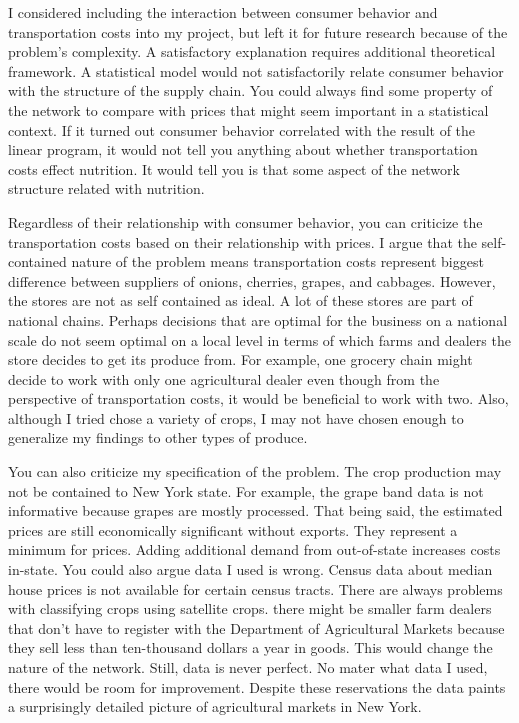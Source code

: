 \documentclass{report}
\begin{document}
I considered including the interaction between consumer behavior and transportation costs into my project, but left it for future research because of the problem's complexity. A satisfactory explanation requires additional theoretical framework. A statistical model would not satisfactorily relate consumer behavior with the structure of the supply chain. You could always find some property of the network to compare with prices that might seem important in a statistical context. If it turned out consumer behavior correlated with the result of the linear program, it would not tell you anything about whether transportation costs effect nutrition. It would tell you is that some aspect of the network structure related with nutrition.

Regardless of their relationship with consumer behavior, you can criticize the transportation costs based on their relationship with prices. I argue that the self-contained nature of the problem means transportation costs represent biggest difference between suppliers of onions, cherries, grapes, and cabbages. However, the stores are not as self contained as ideal. A lot of these stores are part of national chains. Perhaps decisions that are optimal for the business on a national scale do not seem optimal on a local level in terms of which farms and dealers the store decides to get its produce from. For example, one grocery chain might decide to work with only one agricultural dealer even though from the perspective of transportation costs, it would be beneficial to work with two. Also, although I tried chose a variety of crops, I may not have chosen enough to generalize my findings to other types of produce.

You can also criticize my specification of the problem. The crop production may not be contained to New York state. For example, the grape band data is not informative because grapes are mostly processed. That being said, the estimated prices are still economically significant without exports. They represent a minimum for prices. Adding additional demand from out-of-state increases costs in-state. You could also argue data I used is wrong. Census data about median house prices is not available for certain census tracts. There are always problems with classifying crops using satellite crops. there might be smaller farm dealers that don't have to register with the Department of Agricultural Markets because they sell less than ten-thousand dollars a year in goods. This would change the nature of the network. Still, data is never perfect. No mater what data I used, there would be room for improvement. Despite these reservations the data paints a surprisingly detailed picture of agricultural markets in New York. 
\end{document}
